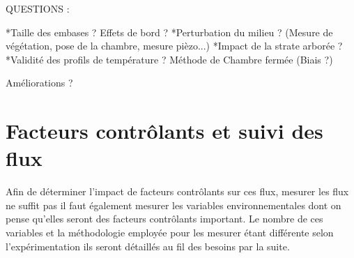 QUESTIONS :

*Taille des embases ? Effets de bord ?
*Perturbation du milieu ? (Mesure de végétation, pose de la chambre, mesure pièzo...)
*Impact de la strate arborée ?
*Validité des profils de température ?
Méthode de Chambre fermée (Biais ?)

Améliorations ? 


\section{Facteurs contrôlants et suivi des flux}
Afin de déterminer l'impact de facteurs contrôlants sur ces flux, mesurer les flux ne suffit pas il faut également mesurer les variables environnementales dont on pense qu'elles seront des facteurs contrôlants important. Le nombre de ces variables et la méthodologie employée pour les mesurer étant différente selon l'expérimentation ils seront détaillés au fil des besoins par la suite.
